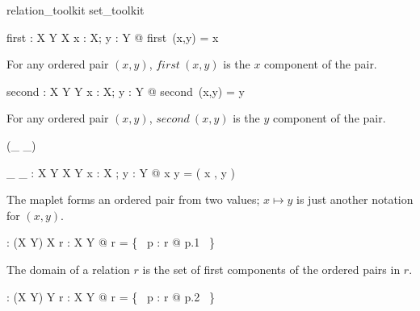 \documentclass[draft,a4paper,10pt,wd]{isov2}
\begin{document}

\begin{zsection}
\SECTION relation\_toolkit \parents set\_toolkit
\end{zsection}


\begin{gendef}[X,Y]
first : X \cross Y  \fun X
\where
\forall x : X; y : Y @ first~(x,y) = x
\end{gendef}

For any ordered pair $(x,y)$,
$first~(x,y)$ is the $x$ component of the pair.


\begin{gendef}[X,Y]
second : X \cross Y \fun Y
\where
\forall x : X; y : Y @ second~(x,y) = y
\end{gendef}

For any ordered pair $(x,y)$,
$second~(x,y)$ is the $y$ component of the pair.


\begin{zed}
 \leftassoc (\_ \mapsto \_)
\end{zed}

\begin{gendef}[X,Y]
\_ \mapsto \_ : X \cross Y \fun X \cross Y
\where
\forall x : X ; y : Y @ x \mapsto y = ( x , y )
\end{gendef}

The maplet forms an ordered pair from two values;
$x \mapsto y$ is just another notation for $(x, y)$.


\begin{gendef}[X,Y]
\dom : (X \rel Y) \fun \power X
\where
\forall r : X \rel Y @ \dom r = \{~ p : r @ p.1 ~\}
\end{gendef}

The domain of a relation $r$ is the set of first components of the ordered
pairs in $r$.


\begin{gendef}[X,Y]
\ran : (X \rel Y) \fun \power Y
\where
\forall r : X \rel Y @ \ran r = \{~ p : r @ p.2 ~\}
\end{gendef}
\end{document}
